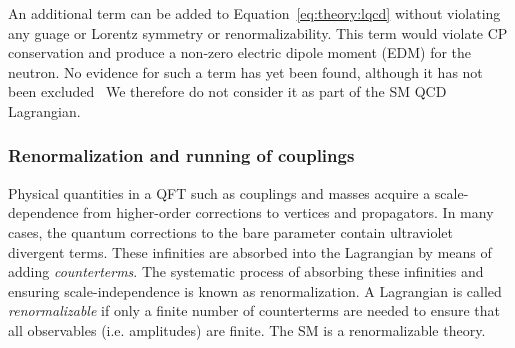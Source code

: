 An additional term can be added to Equation~\ref{eq:theory:lqcd} without violating any guage or Lorentz symmetry or renormalizability.
This term would violate CP conservation and produce a non-zero electric dipole moment (EDM) for the neutron.
No evidence for such a term has yet been found, although it has not been excluded~\cite{nedm1}
We therefore do not consider it as part of the SM QCD Lagrangian. 

\subsubsection{Renormalization and running of couplings}

Physical quantities in a QFT such as couplings and masses acquire a scale-dependence from higher-order corrections to vertices and propagators. 
In many cases, the quantum corrections to the bare parameter contain ultraviolet divergent terms.
These infinities are absorbed into the Lagrangian by means of adding \emph{counterterms}. 
The systematic process of absorbing these infinities and ensuring scale-independence is known as renormalization.
A Lagrangian is called \emph{renormalizable} if only a finite number of counterterms are needed to ensure that all observables (i.e. amplitudes) are finite. 
The SM is a renormalizable theory.

